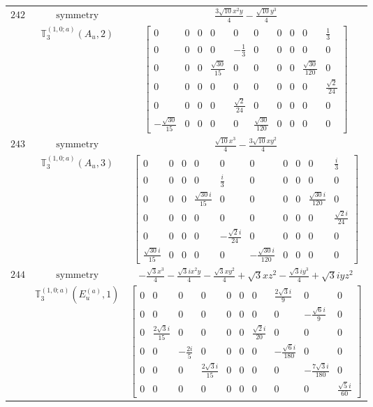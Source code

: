 \documentclass[fleqn,8pt,landscape]{jsarticle}
\begin{document}
\begin{longtable}{ccc}
$ 242 $ & $ \text{symmetry} $ & $ \frac{3 \sqrt{10} x^{2} y}{4} - \frac{\sqrt{10} y^{3}}{4} $ \\
$  $ & $ \mathbb{T}_{3}^{(1,0;a)}(A_{u},2) $ & $ \begin{bmatrix} 0 & 0 & 0 & 0 & 0 & 0 & 0 & 0 & 0 & \frac{1}{3} \\ 0 & 0 & 0 & 0 & - \frac{1}{3} & 0 & 0 & 0 & 0 & 0 \\ 0 & 0 & 0 & \frac{\sqrt{30}}{15} & 0 & 0 & 0 & 0 & \frac{\sqrt{30}}{120} & 0 \\ 0 & 0 & 0 & 0 & 0 & 0 & 0 & 0 & 0 & \frac{\sqrt{2}}{24} \\ 0 & 0 & 0 & 0 & \frac{\sqrt{2}}{24} & 0 & 0 & 0 & 0 & 0 \\ - \frac{\sqrt{30}}{15} & 0 & 0 & 0 & 0 & \frac{\sqrt{30}}{120} & 0 & 0 & 0 & 0 \end{bmatrix} $ \\ \hline
$ 243 $ & $ \text{symmetry} $ & $ \frac{\sqrt{10} x^{3}}{4} - \frac{3 \sqrt{10} x y^{2}}{4} $ \\
$  $ & $ \mathbb{T}_{3}^{(1,0;a)}(A_{u},3) $ & $ \begin{bmatrix} 0 & 0 & 0 & 0 & 0 & 0 & 0 & 0 & 0 & \frac{i}{3} \\ 0 & 0 & 0 & 0 & \frac{i}{3} & 0 & 0 & 0 & 0 & 0 \\ 0 & 0 & 0 & \frac{\sqrt{30} i}{15} & 0 & 0 & 0 & 0 & \frac{\sqrt{30} i}{120} & 0 \\ 0 & 0 & 0 & 0 & 0 & 0 & 0 & 0 & 0 & \frac{\sqrt{2} i}{24} \\ 0 & 0 & 0 & 0 & - \frac{\sqrt{2} i}{24} & 0 & 0 & 0 & 0 & 0 \\ \frac{\sqrt{30} i}{15} & 0 & 0 & 0 & 0 & - \frac{\sqrt{30} i}{120} & 0 & 0 & 0 & 0 \end{bmatrix} $ \\ \hline
$ 244 $ & $ \text{symmetry} $ & $ - \frac{\sqrt{3} x^{3}}{4} - \frac{\sqrt{3} i x^{2} y}{4} - \frac{\sqrt{3} x y^{2}}{4} + \sqrt{3} x z^{2} - \frac{\sqrt{3} i y^{3}}{4} + \sqrt{3} i y z^{2} $ \\
$  $ & $ \mathbb{T}_{3}^{(1,0;a)}(E_{u}^{(a)},1) $ & $ \begin{bmatrix} 0 & 0 & 0 & 0 & 0 & 0 & 0 & \frac{2 \sqrt{3} i}{9} & 0 & 0 \\ 0 & 0 & 0 & 0 & 0 & 0 & 0 & 0 & - \frac{\sqrt{6} i}{9} & 0 \\ 0 & \frac{2 \sqrt{3} i}{15} & 0 & 0 & 0 & 0 & \frac{\sqrt{2} i}{20} & 0 & 0 & 0 \\ 0 & 0 & - \frac{2 i}{5} & 0 & 0 & 0 & 0 & - \frac{\sqrt{6} i}{180} & 0 & 0 \\ 0 & 0 & 0 & \frac{2 \sqrt{3} i}{15} & 0 & 0 & 0 & 0 & - \frac{7 \sqrt{3} i}{180} & 0 \\ 0 & 0 & 0 & 0 & 0 & 0 & 0 & 0 & 0 & \frac{\sqrt{5} i}{60} \end{bmatrix} $ \\ \hline

\end{longtable}
\end{document}
